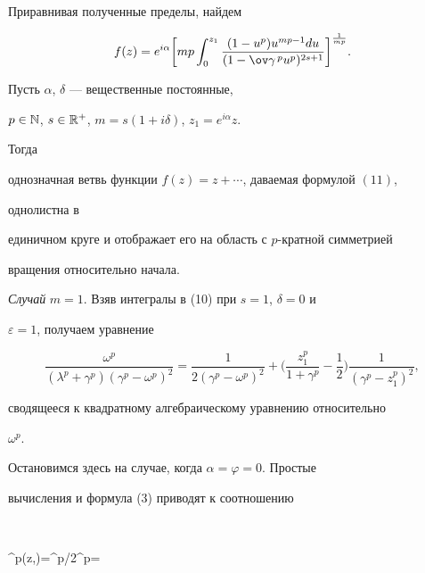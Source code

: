  


Приравнивая полученные пределы, найдем 


\begin{equation} 


f(z)=e^{i\alpha}\bigg[ mp\int^{z_1}_0 


\frac{(1-u^p)u^{mp-1}du}{(1-\ov\gamma^{\,p}u^p)^{2s+1}} 


\bigg]^{\frac{1}{mp}}. 


\end{equation} 


 


\begin{thm} 


Пусть $\alpha$, $\delta$ --- вещественные постоянные, 


$p\in\Bbb N$, $s\in\Bbb R^+$, $m=s(1+i\delta)$, $z_1=e^{i\alpha}z$. 


Тогда 


однозначная ветвь функции $f(z)=z+\dotsb$, даваемая формулой $(11)$, 


однолистна в 


единичном круге и отображает его на область с $p$-кратной симметрией 


вращения относительно начала. 


\end{thm} 


 


{\it Случай} $m=1$. Взяв интегралы в (10) при $s=1$, $\delta=0$ и 


$\varepsilon=1$, получаем уравнение 


$$ 


\frac{\omega^p}{(\lambda^p+\gamma^p)(\gamma^p-\omega^p)^2}= 


\frac{1}{2(\gamma^p-\omega^p)^2}+\bigg( 


\frac{z^p_1}{1+\gamma^p}-\frac{1}{2}\bigg) 


\frac{1}{(\gamma^p-z^p_1)^2}, 


$$ 


сводящееся к квадратному алгебраическому уравнению относительно 


$\omega^p$. 


Остановимся здесь на случае, когда $\alpha=\varphi=0$. Простые 


вычисления и формула (3) приводят к соотношению 


$$ 


\zeta^p(z,\tau)=\lambda^{p/2}\omega^p= 


